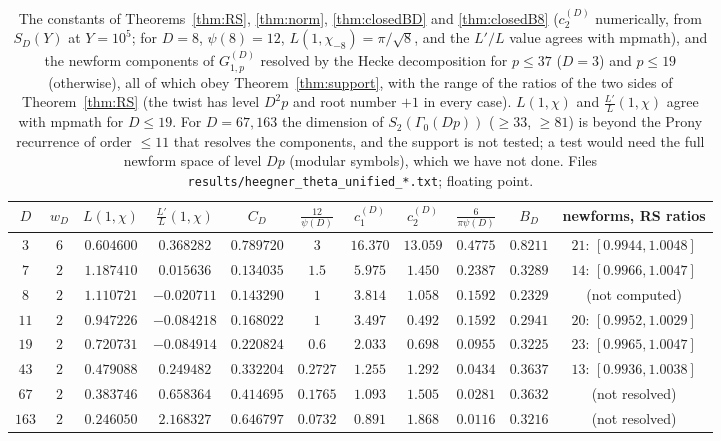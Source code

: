 \documentclass[11pt]{amsart}
\theoremstyle{remark}
\begin{document}
\begin{table}[htbp]
\centering\footnotesize\setlength{\tabcolsep}{3.5pt}
\begin{tabular}{c|cccc|ccc|cc|c}
\toprule
$D$ & $w_D$ & $L(1,\chi)$ & $\frac{L'}L(1,\chi)$ & $C_D$ & $\frac{12}{\psi(D)}$ & $c_1^{(D)}$ & $c_2^{(D)}$ & $\frac6{\pi\psi(D)}$ & $B_D$ & newforms, RS ratios\\
\midrule
$3$ & $6$ & $0.604600$ & $0.368282$ & $0.789720$ & $3$ & $16.370$ & $13.059$ & $0.4775$ & $0.8211$ & $21$: $[0.9944,1.0048]$\\
$7$ & $2$ & $1.187410$ & $0.015636$ & $0.134035$ & $1.5$ & $5.975$ & $1.450$ & $0.2387$ & $0.3289$ & $14$: $[0.9966,1.0047]$\\
$8$ & $2$ & $1.110721$ & $-0.020711$ & $0.143290$ & $1$ & $3.814$ & $1.058$ & $0.1592$ & $0.2329$ & (not computed)\\
$11$ & $2$ & $0.947226$ & $-0.084218$ & $0.168022$ & $1$ & $3.497$ & $0.492$ & $0.1592$ & $0.2941$ & $20$: $[0.9952,1.0029]$\\
$19$ & $2$ & $0.720731$ & $-0.084914$ & $0.220824$ & $0.6$ & $2.033$ & $0.698$ & $0.0955$ & $0.3225$ & $23$: $[0.9965,1.0047]$\\
$43$ & $2$ & $0.479088$ & $0.249482$ & $0.332204$ & $0.2727$ & $1.255$ & $1.292$ & $0.0434$ & $0.3637$ & $13$: $[0.9936,1.0038]$\\
$67$ & $2$ & $0.383746$ & $0.658364$ & $0.414695$ & $0.1765$ & $1.093$ & $1.505$ & $0.0281$ & $0.3632$ & (not resolved)\\
$163$ & $2$ & $0.246050$ & $2.168327$ & $0.646797$ & $0.0732$ & $0.891$ & $1.868$ & $0.0116$ & $0.3216$ & (not resolved)\\
\bottomrule
\end{tabular}
\medskip
\caption{The constants of Theorems~\ref{thm:RS}, \ref{thm:norm}, \ref{thm:closedBD} and \ref{thm:closedB8} ($c_2^{(D)}$ numerically, from $S_D(Y)$ at $Y=10^5$; for $D=8$, $\psi(8)=12$, $L(1,\chi_{-8})=\pi/\sqrt8$, and the $L'/L$ value agrees with mpmath), and the newform components of $G^{(D)}_{1,p}$ resolved by the Hecke decomposition for $p\le37$ ($D=3$) and $p\le19$ (otherwise), all of which obey Theorem~\ref{thm:support}, with the range of the ratios of the two sides of Theorem~\ref{thm:RS} (the twist has level $D^2p$ and root number $+1$ in every case). $L(1,\chi)$ and $\frac{L'}L(1,\chi)$ agree with mpmath for $D\le19$. For $D=67,163$ the dimension of $S_2(\Gamma_0(Dp))$ ($\ge33$, $\ge81$) is beyond the Prony recurrence of order $\le11$ that resolves the components, and the support is not tested; a test would need the full newform space of level $Dp$ (modular symbols), which we have not done. Files \texttt{results/heegner\_theta\_unified\_*.txt}; floating point.}
\label{tab:constants}
\end{table}
\end{document}
